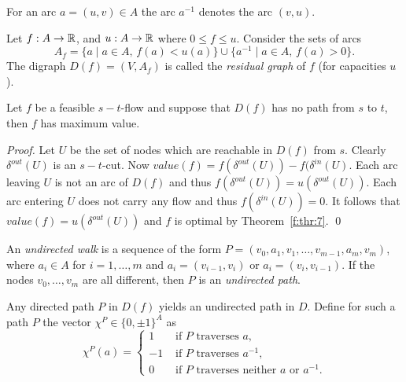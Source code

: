 For an arc $a = (u,v) \in A$ the arc $a^{-1}$ denotes the arc $(v,u)$. 

\begin{definition}
  Let $f:A \to \mathbb{R}$,  and $u: A \to \mathbb{R}$ where $0 \leq f \leq u$. Consider
  the sets of arcs
  \begin{equation}
    \label{f:eq:30}
    A_f = \{ a \mid a \in A, \, f(a) < u(a)\} \cup \{ a^{-1} \mid a \in A, \, f(a) >    0\}. 
  \end{equation}
  The digraph $D(f) = (V,A_f)$ is called the \emph{residual graph} of
  $f$ (for capacities $u$).   
\end{definition}



\begin{corollary}
  \label{co:6}
  Let $f$ be a feasible $s-t$-flow and suppose that $D(f)$ has no path
  from $s$ to $t$, then $f$ has maximum value.
\end{corollary}


\begin{proof}
  Let $U$ be the set of nodes which are reachable in $D(f)$ from
  $s$. Clearly $\delta^{out}(U)$ is an $s-t$-cut. Now $value(f) = f(\delta^{out}(U)) -
  f(\delta^{in}(U)$.  Each arc leaving $U$ is not an arc of $D(f)$ and thus
  $f(\delta^{out}(U)) = u (\delta^{out}(U))$. Each arc entering $U$ does not
  carry any flow   and thus $f(\delta^{in}(U)) = 0$. It follows that  
  $value(f) = u (\delta^{out}(U))$ and $f$ is optimal by
  Theorem~\ref{f:thr:7}.   \qed
\end{proof}

\begin{definition}
\label{f:def:7}
  An \emph{undirected walk} is a  sequence of the form
  $P=(v_0,a_1,v_1,\ldots,v_{m-1},a_m,v_m)$, where  $a_i \in A$ for
  $i=1,\ldots,m$ and $a_i = (v_{i-1},v_i)$ or $a_i = (v_{i},v_{i-1})$. If
  the nodes $v_0,\ldots,v_m$ are all 
  different, then $P$ is an \emph{undirected path}. 
\end{definition}


Any directed path $P$ in $D(f)$ yields an undirected path  in
$D$. Define for such a path $P$ the vector $\chi^P \in \{0,\pm1\}^A$ as
\begin{equation}
  \label{f:eq:29}
  \chi^P(a) = 
  \begin{cases}
    1 & \mbox{ if $P$ traverses $a$},\\
    -1&  \mbox{ if $P$ traverses $a^{-1}$},\\
    0 & \mbox{ if $P$ traverses neither $a$ or $a^{-1}$}. 
  \end{cases}
\end{equation}


